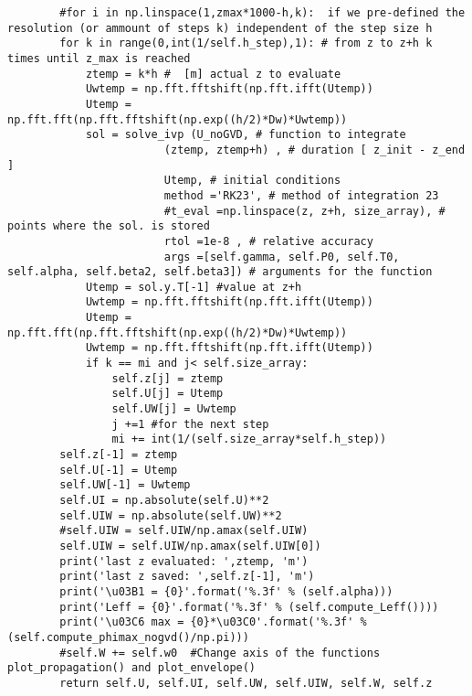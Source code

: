 \begin{verbatim}
        #for i in np.linspace(1,zmax*1000-h,k):  if we pre-defined the resolution (or ammount of steps k) independent of the step size h
        for k in range(0,int(1/self.h_step),1): # from z to z+h k times until z_max is reached
            ztemp = k*h #  [m] actual z to evaluate
            Uwtemp = np.fft.fftshift(np.fft.ifft(Utemp))
            Utemp = np.fft.fft(np.fft.fftshift(np.exp((h/2)*Dw)*Uwtemp))
            sol = solve_ivp (U_noGVD, # function to integrate
                        (ztemp, ztemp+h) , # duration [ z_init - z_end ]
                        Utemp, # initial conditions
                        method ='RK23', # method of integration 23
                        #t_eval =np.linspace(z, z+h, size_array), # points where the sol. is stored
                        rtol =1e-8 , # relative accuracy
                        args =[self.gamma, self.P0, self.T0, self.alpha, self.beta2, self.beta3]) # arguments for the function
            Utemp = sol.y.T[-1] #value at z+h
            Uwtemp = np.fft.fftshift(np.fft.ifft(Utemp))
            Utemp = np.fft.fft(np.fft.fftshift(np.exp((h/2)*Dw)*Uwtemp))
            Uwtemp = np.fft.fftshift(np.fft.ifft(Utemp))
            if k == mi and j< self.size_array:
                self.z[j] = ztemp
                self.U[j] = Utemp
                self.UW[j] = Uwtemp
                j +=1 #for the next step
                mi += int(1/(self.size_array*self.h_step))
        self.z[-1] = ztemp
        self.U[-1] = Utemp
        self.UW[-1] = Uwtemp
        self.UI = np.absolute(self.U)**2
        self.UIW = np.absolute(self.UW)**2
        #self.UIW = self.UIW/np.amax(self.UIW) 
        self.UIW = self.UIW/np.amax(self.UIW[0])
        print('last z evaluated: ',ztemp, 'm')
        print('last z saved: ',self.z[-1], 'm')
        print('\u03B1 = {0}'.format('%.3f' % (self.alpha)))
        print('Leff = {0}'.format('%.3f' % (self.compute_Leff())))
        print('\u03C6 max = {0}*\u03C0'.format('%.3f' % (self.compute_phimax_nogvd()/np.pi)))
        #self.W += self.w0  #Change axis of the functions plot_propagation() and plot_envelope()
        return self.U, self.UI, self.UW, self.UIW, self.W, self.z


\end{verbatim}
